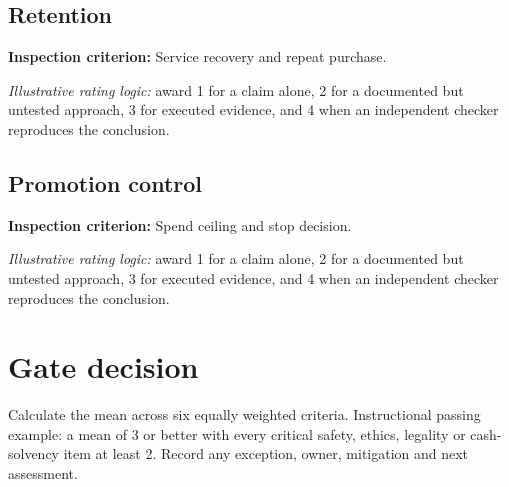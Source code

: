 \documentclass[11pt]{article}
\begin{document}
\subsection*{Retention}
\textbf{Inspection criterion:} Service recovery and repeat purchase.\par\textit{Illustrative rating logic:} award 1 for a claim alone, 2 for a documented but untested approach, 3 for executed evidence, and 4 when an independent checker reproduces the conclusion.\par
\subsection*{Promotion control}
\textbf{Inspection criterion:} Spend ceiling and stop decision.\par\textit{Illustrative rating logic:} award 1 for a claim alone, 2 for a documented but untested approach, 3 for executed evidence, and 4 when an independent checker reproduces the conclusion.\par
\section{Gate decision}
Calculate the mean across six equally weighted criteria. Instructional passing example: a mean of 3 or better with every critical safety, ethics, legality or cash-solvency item at least 2. Record any exception, owner, mitigation and next assessment.
\end{document}
